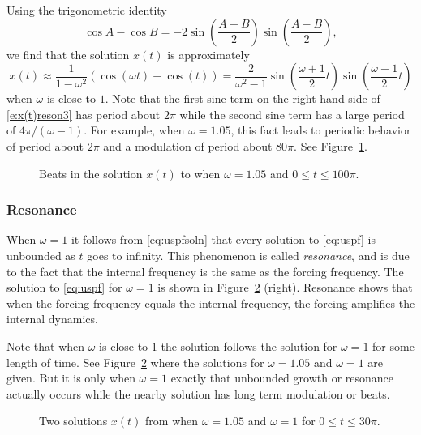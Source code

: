 \documentclass{ximera}
\begin{document}
Using the trigonometric identity
\[
\cos A - \cos B = -2\sin\left(\frac{A+B}{2}\right)
\sin\left(\frac{A-B}{2}\right),
\]
we find that the solution $x(t)$ is approximately
\begin{equation}  \label{e:x(t)reson3}
x(t) \approx  \frac{1}{1-\omega^2} (\cos(\omega t)-\cos(t))=
\frac{2}{\omega ^2-1}
\sin\left(\frac{\omega+1}{2}t\right)\sin\left(\frac{\omega-1}{2}t\right)
\end{equation}
when $\omega$ is close to $1$.  Note that the first sine term on the right hand
side of \eqref{e:x(t)reson3} has period about $2\pi$ while the second sine term 
has a large period of $4\pi/(\omega-1)$.  For example, when $\omega=1.05$, this
fact leads to periodic behavior of period about $2\pi$ and a 
modulation 
of period about $80\pi$.  See Figure~\ref{F:beats}.
\begin{figure}[htb]
           \centerline{%
           }
           \caption{Beats in the solution $x(t)$ to \protect{\eqref{e:x(t)reson}} 
		when $\omega =1.05$ and $0\leq t\leq 100\pi$.}
           \label{F:beats}
\end{figure}  

\subsubsection*{Resonance}

When $\omega = 1$ it follows from \eqref{eq:uspfsoln} that every
solution to \eqref{eq:uspf} is unbounded as $t$ goes to infinity.  This
phenomenon is called {\em resonance\/}, and is due to the fact that the
internal frequency is the same as the 
forcing frequency.  The solution
to \eqref{eq:uspf} for $\omega=1$ is shown in Figure~\ref{F:reson} (right).
Resonance shows that when the forcing frequency equals the internal 
frequency, the forcing amplifies the internal dynamics.

Note that when $\omega$ is close to $1$ the solution follows the solution 
for $\omega =1$ for some length of time.  See Figure~\ref{F:reson} where 
the solutions for $\omega =1.05$ and $\omega =1$ are given.  But it is only 
when $\omega =1$ exactly that unbounded growth or resonance actually occurs 
while the nearby solution has long term modulation or beats.
\begin{figure}[htb]
           \centerline{%
           }
           \caption{Two solutions $x(t)$ from \protect{\eqref{e:x(t)reson}} when
                $\omega =1.05$ and $\omega =1$ for $0\leq t\leq 30\pi$.}
           \label{F:reson}
\end{figure}  
\end{document}
